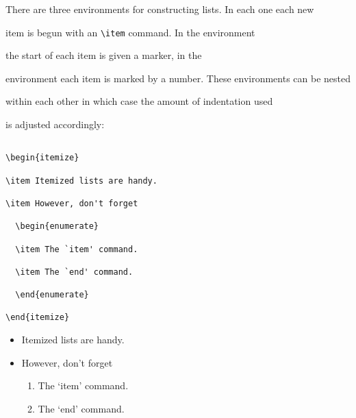 There are three environments for constructing lists.  In each one each new

item is begun with an \verb|\item| command.  In the  environment

the start of each item is given a marker, in the 

environment each item is marked by a number.  These environments can be nested

within each other in which case the amount of indentation used

is adjusted accordingly:

\egstart

\begin{verbatim}

\begin{itemize}

\item Itemized lists are handy.

\item However, don't forget

  \begin{enumerate}

  \item The `item' command.

  \item The `end' command.

  \end{enumerate}

\end{itemize}

\end{verbatim}

\egmid%

\begin{itemize}

\item Itemized lists are handy.

\item However, don't forget

  \begin{enumerate}

  \item The `item' command.

  \item The `end' command.

  \end{enumerate}

\end{itemize}


